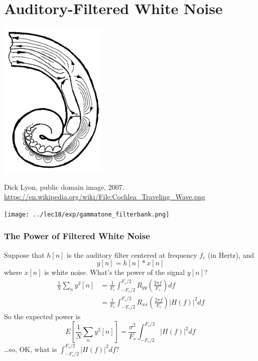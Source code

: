   
\section[White]{Auditory-Filtered White Noise}
\setcounter{subsection}{1}

\begin{frame}
  \centerline{\includegraphics[height=3in]{../lec18/Cochlea_Traveling_Wave.png}}
  \begin{tiny}
    Dick Lyon, public domain image, 2007.
    \url{https://en.wikipedia.org/wiki/File:Cochlea_Traveling_Wave.png}
  \end{tiny}
\end{frame}

\begin{frame}
  \centerline{\texttt{[image: ../lec18/exp/gammatone\_filterbank.png]}}
\end{frame}
     
\begin{frame}
  \frametitle{The Power of Filtered White Noise}

  Suppose that $h[n]$ is the auditory filter centered at frequency $f_c$ (in Hertz), and
  \[
  y[n]=h[n]\ast x[n]
  \]
  where $x[n]$ is white noise.  What's the power of the signal $y[n]$?
  \begin{align*}
    \frac{1}{N}\sum_n y^2[n] &= \frac{1}{F_s}\int_{-F_s/2}^{F_s/2} R_{yy}\left(\frac{2\pi f}{F_s}\right) df\\
    &= \frac{1}{F_s}\int_{-F_s/2}^{F_s/2} R_{xx}\left(\frac{2\pi f}{F_s}\right)|H(f)|^2 df
  \end{align*}
  So the expected power is
  \[
  E\left[\frac{1}{N}\sum_n y^2[n]\right] = \frac{\sigma^2}{F_s}\int_{-F_s/2}^{F_s/2} |H(f)|^2 df
  \]
  \ldots so, OK, what is $\int_{-F_s/2}^{F_s/2} |H(f)|^2 df$?
\end{frame}


